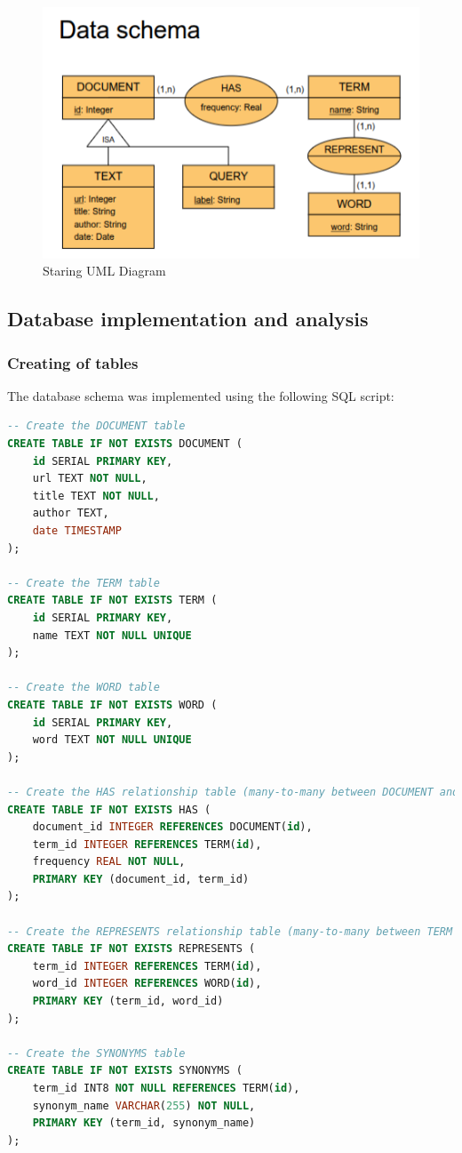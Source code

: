 \documentclass[twoside]{article}
\begin{document}
\begin{figure}[H]
  \centering
  \includegraphics[width=1\textwidth]{imgs/uml.png}
  \caption{Staring UML Diagram}
  \label{fig:3}
\end{figure}


\subsection{Database implementation and analysis}

\subsubsection{Creating of tables}
The database schema was implemented using the following SQL script:

\begin{lstlisting}[language=SQL,caption={SQL Script for Creating Tables},label={lst:createtables}]
-- Create the DOCUMENT table
CREATE TABLE IF NOT EXISTS DOCUMENT (
    id SERIAL PRIMARY KEY,
    url TEXT NOT NULL,
    title TEXT NOT NULL,
    author TEXT,
    date TIMESTAMP
);

-- Create the TERM table
CREATE TABLE IF NOT EXISTS TERM (
    id SERIAL PRIMARY KEY,
    name TEXT NOT NULL UNIQUE
);

-- Create the WORD table
CREATE TABLE IF NOT EXISTS WORD (
    id SERIAL PRIMARY KEY,
    word TEXT NOT NULL UNIQUE
);

-- Create the HAS relationship table (many-to-many between DOCUMENT and TERM)
CREATE TABLE IF NOT EXISTS HAS (
    document_id INTEGER REFERENCES DOCUMENT(id),
    term_id INTEGER REFERENCES TERM(id),
    frequency REAL NOT NULL,
    PRIMARY KEY (document_id, term_id)
);

-- Create the REPRESENTS relationship table (many-to-many between TERM and WORD)
CREATE TABLE IF NOT EXISTS REPRESENTS (
    term_id INTEGER REFERENCES TERM(id),
    word_id INTEGER REFERENCES WORD(id),
    PRIMARY KEY (term_id, word_id)
);

-- Create the SYNONYMS table
CREATE TABLE IF NOT EXISTS SYNONYMS (
    term_id INT8 NOT NULL REFERENCES TERM(id),
    synonym_name VARCHAR(255) NOT NULL,
    PRIMARY KEY (term_id, synonym_name)
);
\end{lstlisting}
\end{document}
